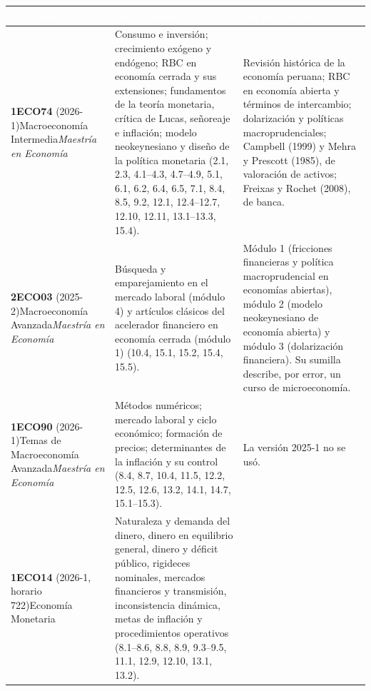 \documentclass[11pt,a4paper]{article}
\newcommand{\cab}[1]{\textcolor{white}{\sffamily\bfseries #1}}
\newcommand{\filasalternas}{\rowcolors{2}{white}{tonoPalido}}
\begin{document}
\medskip
{\small\filasalternas
\noindent\begin{tabularx}{\textwidth}{>{\raggedright\arraybackslash}p{3.1cm}>{\raggedright\arraybackslash}X>{\raggedright\arraybackslash}X}
\toprule
\rowcolor{tonoOscuro}\cab{Programa} & \cab{Incorporado} & \cab{No incorporado} \\
\midrule
\textbf{1ECO74} (2026-1)\newline Macroeconomía Intermedia\newline\emph{Maestría en Economía}
 & Consumo e inversión; crecimiento exógeno y endógeno; RBC en economía cerrada y sus extensiones; fundamentos de la teoría monetaria, crítica de Lucas, señoreaje e inflación; modelo neokeynesiano y diseño de la política monetaria (2.1, 2.3, 4.1--4.3, 4.7--4.9, 5.1, 6.1, 6.2, 6.4, 6.5, 7.1, 8.4, 8.5, 9.2, 12.1, 12.4--12.7, 12.10, 12.11, 13.1--13.3, 15.4).
 & Revisión histórica de la economía peruana; RBC en economía abierta y términos de intercambio; dolarización y políticas macroprudenciales; Campbell (1999) y Mehra y Prescott (1985), de valoración de activos; Freixas y Rochet (2008), de banca. \\[3pt]
\textbf{2ECO03} (2025-2)\newline Macroeconomía Avanzada\newline\emph{Maestría en Economía}
 & Búsqueda y emparejamiento en el mercado laboral (módulo 4) y artículos clásicos del acelerador financiero en economía cerrada (módulo 1) (10.4, 15.1, 15.2, 15.4, 15.5).
 & Módulo 1 (fricciones financieras y política macroprudencial en economías abiertas), módulo 2 (modelo neokeynesiano de economía abierta) y módulo 3 (dolarización financiera). Su sumilla describe, por error, un curso de microeconomía. \\[3pt]
\textbf{1ECO90} (2026-1)\newline Temas de Macroeconomía Avanzada\newline\emph{Maestría en Economía}
 & Métodos numéricos; mercado laboral y ciclo económico; formación de precios; determinantes de la inflación y su control (8.4, 8.7, 10.4, 11.5, 12.2, 12.5, 12.6, 13.2, 14.1, 14.7, 15.1--15.3).
 & La versión 2025-1 no se usó. \\[3pt]
\textbf{1ECO14} (2026-1, horario 722)\newline Economía Monetaria
 & Naturaleza y demanda del dinero, dinero en equilibrio general, dinero y déficit público, rigideces nominales, mercados financieros y transmisión, inconsistencia dinámica, metas de inflación y procedimientos operativos (8.1--8.6, 8.8, 8.9, 9.3--9.5, 11.1, 12.9, 12.10, 13.1, 13.2).

\end{tabularx}}
\end{document}
